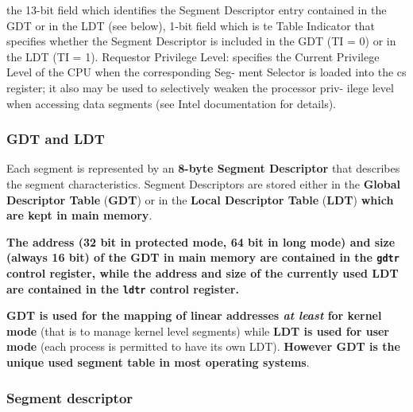 \documentclass[10pt,a4paper]{article}
\begin{document}
 the 13-bit field which identifies the Segment Descriptor entry contained in the GDT or in the LDT (see below), 1-bit field which is te Table Indicator that specifies whether the Segment Descriptor is included in the GDT (TI = 0) or in the LDT (TI = 1). Requestor Privilege Level: specifies the Current Privilege Level of the CPU when the corresponding Seg-
ment Selector is loaded into the cs register; it also may be used to selectively weaken the processor priv-
ilege level when accessing data segments (see Intel documentation for details).

\subsubsection{GDT and LDT}

Each segment is represented by an \textbf{8-byte Segment Descriptor} that describes the segment characteristics. Segment Descriptors are stored either in the \textbf{Global Descriptor Table} (\textbf{GDT}) or in the \textbf{Local Descriptor Table} (\textbf{LDT}) \textbf{which are kept in main memory}.

\textbf{The address (32 bit in protected mode, 64 bit in long mode) and size (always 16 bit) of the GDT in main memory are contained in the \texttt{gdtr} control register, while the address and size of the currently used LDT are contained in the \texttt{ldtr} control register.}

\textbf{GDT is used for the mapping of linear addresses \textit{at least} for kernel mode} (that is to manage kernel level segments) while \textbf{LDT is used for user mode} (each process is permitted to have its own LDT). \textbf{However GDT is the unique used segment table in most operating systems}.

\subsubsection{Segment descriptor}
\end{document}
